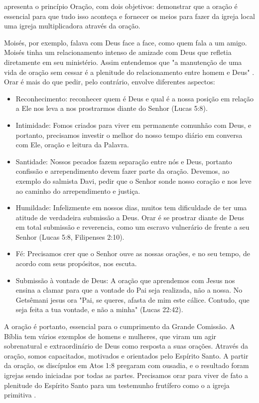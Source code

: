 \documentclass[12pt,openright,oneside,a4paper,
english,french,spanish,brazil]{abntex2}
\begin{document}
\begin{citacao}apresenta o princípio Oração, com dois objetivos: demonstrar que a oração é essencial para que tudo isso aconteça e fornecer os meios para fazer da igreja local uma igreja multiplicadora através da oração\cite[p. 29]{brandao}. \end{citacao}

Moisés, por exemplo, falava com Deus face a face, como quem fala a um amigo. Moisés tinha um relacionamento intenso de amizade com Deus que refletia diretamente em seu ministério. Assim entendemos que "a manutenção de uma vida de oração sem cessar é a plenitude do relacionamento entre homem e Deus" \cite[p. 30]{brandao}. Orar é mais do que pedir, pelo contrário, envolve diferentes aspectos:

\begin{itemize}
	\item Reconhecimento: reconhecer quem é Deus e qual é a nossa posição em relação a Ele nos leva a nos prostrarmos diante do Senhor (Lucas 5:8).
	\item Intimidade: Fomos criados para viver em permanente comunhão com Deus, e portanto, precisamos investir o melhor do nosso tempo diário em conversa com Ele, oração e leitura da Palavra.
	\item Santidade: Nossos pecados fazem separação entre nós e Deus, portanto confissão e arrependimento devem fazer parte da oração. Devemos, ao exemplo do salmista Davi, pedir que o Senhor sonde nosso coração e nos leve ao caminho do arrependimento e justiça.
	\item Humildade: Infelizmente em nossos dias, muitos tem dificuldade de ter uma atitude de verdadeira submissão a Deus. Orar é se prostrar diante de Deus em total submissão e reverencia, como um escravo vulnerário de frente a seu Senhor (Lucas 5:8, Filipenses 2:10).
	\item Fé: Precisamos crer que o Senhor ouve as nossas orações, e no seu tempo, de acordo com seus propósitos, nos escuta.
	\item Submissão à vontade de Deus: A oração que aprendemos com Jesus nos ensina a clamar para que a vontade do Pai seja realizada, não a nossa. No Getsêmani jesus ora "Pai, se queres, afasta de mim este cálice. Contudo, que seja feita a tua vontade, e não a minha" (Lucas 22:42).

	\cite[p. 30,31]{brandao}  
\end{itemize}

  A oração é portanto, essencial para o cumprimento da Grande Comissão. A Bíblia tem vários exemplos de homens e mulheres, que viram um agir sobrenatural e extraordinário de Deus como resposta a suas orações. Através da oração, somos capacitados, motivados e orientados pelo Espírito Santo. A partir da oração, os discípulos em Atos 1:8 pregaram com ousadia, e o resultado foram igrejas sendo iniciadas por todas as partes. Precisamos orar para viver de fato a plenitude do Espírito Santo para um testemunho frutífero como o a igreja primitiva \cite[p. 32]{brandao}.
\end{document}
